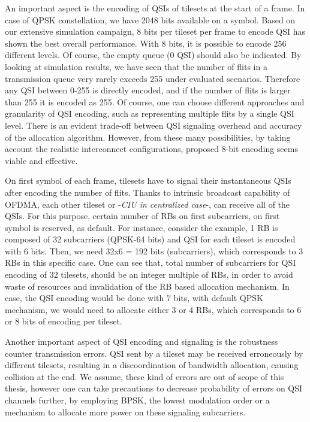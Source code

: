 An important aspect is the encoding of QSIs of tilesets at the start of a frame. In case of QPSK constellation, we have 2048 bits available on a symbol. Based on our extensive simulation campaign, 8 bits per tileset per frame to encode QSI has shown the best overall performance. With 8 bits, it is possible to encode 256 different levels. Of course, the empty queue (0 QSI) should also be indicated. By looking at simulation results, we have seen that the number of flits in a transmission queue very rarely exceeds 255 under evaluated scenarios. Therefore any QSI between 0-255 is directly encoded, and if the number of flits is larger than 255 it is encoded as 255. Of course, one can choose different approaches and granularity of QSI encoding, such as representing multiple flits by a single QSI level. There is an evident trade-off between QSI signaling overhead and accuracy of the allocation algorithm. However, from these many possibilities, by taking account the realistic interconnect configurations, proposed 8-bit encoding seems viable and effective. 


On first symbol of each frame, tilesets have to signal their instantaneous QSIs after encoding the number of flits. Thanks to intrinsic broadcast capability of OFDMA, each other tileset or -\textit{CIU in centralized case}-, can receive all of the QSIs. For this purpose, certain number of RBs on first subcarriers, on first symbol is reserved, as default. For instance, consider the example, 1 RB is composed of 32 subcarriers (QPSK-64 bits) and QSI for each tileset is encoded with 6 bits. Then, we need 32x6 = 192 bits (subcarriers), which corresponds to 3 RBs in this specific case. One can see that, total number of subcarriers for QSI encoding of 32 tilesets, should be an integer multiple of RBs, in order to avoid waste of resources and invalidation of the RB based allocation mechanism. In case, the QSI encoding would be done with 7 bits, with default QPSK mechanism, we would need to allocate either 3 or 4 RBs, which corresponds to 6 or 8 bits of encoding per tileset.   

Another important aspect of QSI encoding and signaling is the robustness counter transmission errors. QSI sent by a tileset may be received erroneously by different tilesets, resulting in a discoordination of bandwidth allocation, causing collision at the end. We assume, these kind of errors are out of scope of this thesis, however one can take precautions to decrease probability of errors on QSI channels further, by employing BPSK, the lowest modulation order or a mechanism to allocate more power on these signaling subcarriers.




